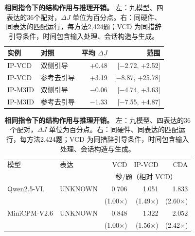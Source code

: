 \begin{table}[t]\centering
\caption{\textbf{相同指令下的结构作用与推理开销。} 左：九模型、四表达的36个配对，$\Delta J$ 单位为百分点。右：同硬件、同表达的匹配运行，每方法2,424题；VCD 为同措辞引导条件，时间包含输入处理、会话构造与生成。}
\label{tab:ablation-cost}
\begin{minipage}[t]{.51\textwidth}\centering\fontsize{8}{10}\selectfont\setlength{\tabcolsep}{3pt}
\begin{tabular}{llrr}\toprule
实例 & 对照 & 平均 $\Delta J$ & 范围\\\midrule
IP-VCD & 双侧引导 & +0.48 & [$-$2.72, +2.52]\\
IP-VCD & 参考去引导 & +3.19 & [$-$8.87, +25.78]\\
IP-M3ID & 双侧引导 & $-$0.06 & [$-$4.74, +3.63]\\
IP-M3ID & 参考去引导 & $-$1.33 & [$-$7.55, +4.87]\\\bottomrule
\end{tabular}\end{minipage}\hfill
\begin{minipage}[t]{.47\textwidth}\centering\fontsize{8}{10}\selectfont\setlength{\tabcolsep}{3pt}
\begin{tabular}{llrrr}\toprule
模型 & 表达 & VCD & IP-VCD & CDA\\
 & & \multicolumn{3}{c}{秒/题（相对 VCD）}\\\midrule
Qwen2.5-VL & UNKNOWN & 0.706 & 1.051 & 1.833\\
 & & (1.00$\times$) & (1.49$\times$) & (2.60$\times$)\\
MiniCPM-V2.6 & UNKNOWN & 0.848 & 1.322 & 2.052\\
 & & (1.00$\times$) & (1.56$\times$) & (2.42$\times$)\\
\bottomrule\end{tabular}\end{minipage}
\end{table}
